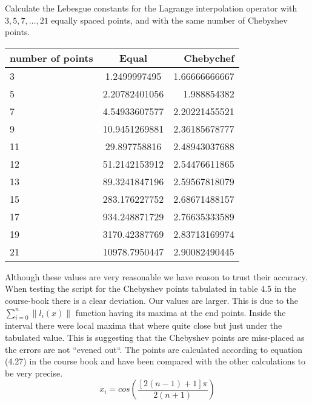 \begin{problem}
Calculate the Lebesgue constants for the Lagrange interpolation
operator with $3, 5, 7, \dots , 21$ equally spaced points, and with the
same number of Chebyshev points.
\end{problem}


\begin{solution}
\begin{tabular}{ l | c | r }
number of points & Equal & Chebychef \\ \hline
3 & 1.2499997495 & 1.66666666667 \\
5 & 2.20782401056 & 1.988854382 \\
7 & 4.54933607577 & 2.20221455521 \\
9 & 10.9451269881 & 2.36185678777 \\
11 & 29.897758816 & 2.48943037688 \\
12 & 51.2142153912 & 2.54476611865 \\
13 & 89.3241847196 & 2.59567818079 \\
15 & 283.176227752 & 2.68671488157 \\
17 & 934.248871729 & 2.76635333589 \\
19 & 3170.42387769 & 2.83713169974 \\
21 & 10978.7950447 & 2.90082490445 \\
\end{tabular}

Although these values are very reasonable we have reason to trust
their accuracy. When testing the script for the Chebyshev points tabulated in
table 4.5 in the course-book there is a clear deviation. Our values are larger. This is
due to the $\sum_{i=0}^n \|l_i(x)\|$ function having its maxima at the
end points. Inside the interval there were local maxima that where
quite close but just under the tabulated value. This is suggesting
that the Chebyshev points are miss-placed as the errors are not
 ``evened out``. The points are calculated according to equation
(4.27) in the course book and have been compared with the other
calculations to be very precise. 
\begin{equation*}
  x_i = cos\left(\frac{[2(n - 1) +1]\pi}{2(n + 1)}\right)
\end{equation*}
\end{solution}

